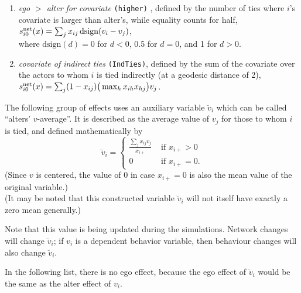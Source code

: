 \documentclass[a4paper,fleqn,11pt]{article}
\newcommand{\+}{\, + \,}
\newcommand{\vit}{\theenumi}
\newcounter{savenumi}
\begin{document}
\begin{enumerate}
 \item {\em ego $>$ alter for covariate} \texttt{(higher)} , %
 defined by the number of ties where $i$'s covariate
 is larger than alter's, while equality counts for half,\\
 $s^{\rm net}_{i\vit}(x) =  \sum_j x_{ij}\, \text{dsign}(v_i - v_j) $,\\
 where $\text{dsign}(d) = 0$ for $d < 0$, 0.5 for $d = 0$,
 and 1 for $d > 0$.

 \item {\em covariate of indirect ties}
 \texttt{(IndTies)}, %
 defined by
 the sum of the covariate over the actors
 to whom $i$ is tied indirectly (at a geodesic distance of 2),\\
 $s^{\rm net}_{i\vit}(x) = \sum_j (1 -x_{ij})
                      \big( \max_h x_{ih}x_{hj} \big) v_j $.
\setcounter{savenumi}{\value{enumi}}
\end{enumerate}

\noindent
The following group of effects uses an auxiliary variable $\breve v_i$ which
can be called ``alters' $v$-average''.
It is described as the average value of $v_j$ for those
to whom $i$ is tied, and defined mathematically by
\begin{equation}
  \breve v_i = \left\{\begin{array}{ll} \displaystyle
         \frac{\sum_j x_{ij}v_j}{x_{i+}}  &  \text{ if } x_{i+} > 0     \\
         0                                &  \text{ if } x_{i+} = 0  .
  \end{array}   \right.            \label{alt_av}
\end{equation}
(Since $v$ is centered, the value of 0 in case $x_{i+} = 0$ is also the mean value
of the original variable.)\\
(It may be noted that this constructed variable $\breve v_i$
will not itself have exactly a zero mean generally.)

Note that this value is being updated during the simulations.
Network changes will change $\breve v_i$; if $v_i$ is a dependent behavior
variable, then behaviour changes will also change $\breve v_i$.

In the following list, there is no ego effect, because the ego effect
of $\breve v_i$ would be the same as the alter effect of $v_i$.
\end{document}
